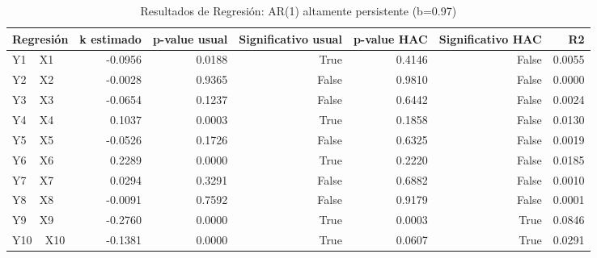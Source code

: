 \begin{table}
\caption{Resultados de Regresión: AR(1) altamente persistente (b=0.97)}
\label{tab:res_ii}
\begin{tabular}{lrrrrrr}
\toprule
Regresión & k estimado & p-value usual & Significativo usual & p-value HAC & Significativo HAC & R2 \\
\midrule
Y1 ~ X1 & -0.0956 & 0.0188 & True & 0.4146 & False & 0.0055 \\
Y2 ~ X2 & -0.0028 & 0.9365 & False & 0.9810 & False & 0.0000 \\
Y3 ~ X3 & -0.0654 & 0.1237 & False & 0.6442 & False & 0.0024 \\
Y4 ~ X4 & 0.1037 & 0.0003 & True & 0.1858 & False & 0.0130 \\
Y5 ~ X5 & -0.0526 & 0.1726 & False & 0.6325 & False & 0.0019 \\
Y6 ~ X6 & 0.2289 & 0.0000 & True & 0.2220 & False & 0.0185 \\
Y7 ~ X7 & 0.0294 & 0.3291 & False & 0.6882 & False & 0.0010 \\
Y8 ~ X8 & -0.0091 & 0.7592 & False & 0.9179 & False & 0.0001 \\
Y9 ~ X9 & -0.2760 & 0.0000 & True & 0.0003 & True & 0.0846 \\
Y10 ~ X10 & -0.1381 & 0.0000 & True & 0.0607 & True & 0.0291 \\
\bottomrule
\end{tabular}
\end{table}

